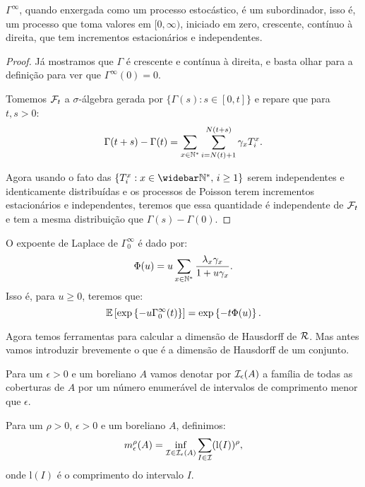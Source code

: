 \begin{proposicao}
  $\Gamma^\infty$, quando enxergada como um processo estocástico, é
  um subordinador, isso é, um processo que toma valores em $[0,
  \infty)$, iniciado em zero, crescente, contínuo à direita, que tem
  incrementos estacionários e independentes.
\end{proposicao}
\begin{proof}

  Já mostramos que $\Gamma$ é crescente e contínua à direita, e basta
  olhar para a definição para ver que $\Gamma^\infty(0) = 0$.

  Tomemos ${\mathcal{F}}_t$ a $\sigma$-álgebra gerada por $\{ \Gamma(s): s \in [0,
  t]\}$ e repare que para $t, s > 0$:
  \begin{displaymath}
    \Gamma(t+s) - \Gamma(t) = \sum_{x \in {\mathbb{N^*}}} \sum_{i =
      N(t)+1}^{N(t+s)} \gamma_x T_i^x.
  \end{displaymath}

  Agora usando o fato das $\{ T_i^x: x \in \Nzb, \, i \geq 1\}$ serem
  independentes e identicamente distribuídas e os processos de Poisson
  terem incrementos estacionários e independentes, teremos que essa
  quantidade é independente de ${\mathcal{F}}_t$ e tem a mesma distribuição que
  $\Gamma(s) - \Gamma(0)$.
\end{proof}

\begin{proposicao}
  O expoente de Laplace de $\Gamma^\infty_0$ é dado por:
  \begin{displaymath}
    \Phi(u) = u \sum_{x \in {\mathbb{N^*}}} \frac{\lambda_x \gamma_x}{1 + u\gamma_x}.
  \end{displaymath}
  Isso é, para $u \geq 0$, teremos que:
  \begin{displaymath}
    {\mathbb{E}} \left[
      \exp \left\{
        -u \Gamma^\infty_0 (t)
      \right\}
    \right] = 
    \exp\left\{
      -t \Phi(u)
    \right\}.
  \end{displaymath}
\end{proposicao}


Agora temos ferramentas para calcular a dimensão de Hausdorff de
${\mathcal{R}}$. Mas antes vamos introduzir brevemente o que é a dimensão de
Hausdorff de um conjunto.

Para um $\epsilon > 0$ e um boreliano $A$ vamos denotar por
${\mathcal{I}}_\epsilon(A)$ a família de todas as coberturas de $A$ por um
número enumerável de intervalos de comprimento menor que $\epsilon$.


Para um $\rho > 0$, $\epsilon > 0$ e um boreliano $A$, definimos:
\begin{equation}
  \label{eq:dim-hausdorff-eps}
  m^\rho_\epsilon(A) = \inf_{{\mathcal{I}} \in {\mathcal{I}}_\epsilon(A)} 
  \sum_{I \in {\mathcal{I}}} (\mathrm{l}(I))^\rho, 
\end{equation}
onde  $\mathrm{l}(I)$ é o comprimento do intervalo $I$.

